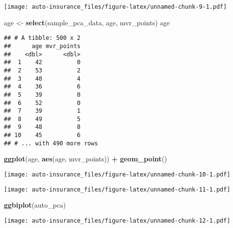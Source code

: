 \documentclass[]{article}
\newenvironment{Shaded}{\begin{snugshade}}{\end{snugshade}}
\newcommand{\KeywordTok}[1]{\textcolor[rgb]{0.13,0.29,0.53}{\textbf{#1}}}
\newcommand{\DataTypeTok}[1]{\textcolor[rgb]{0.13,0.29,0.53}{#1}}
\newcommand{\StringTok}[1]{\textcolor[rgb]{0.31,0.60,0.02}{#1}}
\newcommand{\OtherTok}[1]{\textcolor[rgb]{0.56,0.35,0.01}{#1}}
\newcommand{\OperatorTok}[1]{\textcolor[rgb]{0.81,0.36,0.00}{\textbf{#1}}}
\newcommand{\NormalTok}[1]{#1}
\begin{document}
\texttt{[image: auto-insurance\_files/figure-latex/unnamed-chunk-9-1.pdf]}

\begin{Shaded}
\begin{Highlighting}[]
\NormalTok{age <-}\StringTok{ }\KeywordTok{select}\NormalTok{(sample_pca_data, age, mvr_points)}
\NormalTok{age}
\end{Highlighting}
\end{Shaded}

\begin{verbatim}
## # A tibble: 500 x 2
##      age mvr_points
##    <dbl>      <dbl>
##  1    42          0
##  2    53          2
##  3    40          4
##  4    36          6
##  5    39          0
##  6    52          0
##  7    39          1
##  8    49          5
##  9    48          8
## 10    45          6
## # ... with 490 more rows
\end{verbatim}

\begin{Shaded}
\begin{Highlighting}[]
\KeywordTok{ggplot}\NormalTok{(age, }\KeywordTok{aes}\NormalTok{(age, mvr_points)) }\OperatorTok{+}\StringTok{ }\KeywordTok{geom_point}\NormalTok{()}
\end{Highlighting}
\end{Shaded}

\texttt{[image: auto-insurance\_files/figure-latex/unnamed-chunk-10-1.pdf]}

\begin{Shaded}
\end{Shaded}

\texttt{[image: auto-insurance\_files/figure-latex/unnamed-chunk-11-1.pdf]}

\begin{Shaded}
\begin{Highlighting}[]
\KeywordTok{ggbiplot}\NormalTok{(auto_pca)}
\end{Highlighting}
\end{Shaded}

\texttt{[image: auto-insurance\_files/figure-latex/unnamed-chunk-12-1.pdf]}
\end{document}
